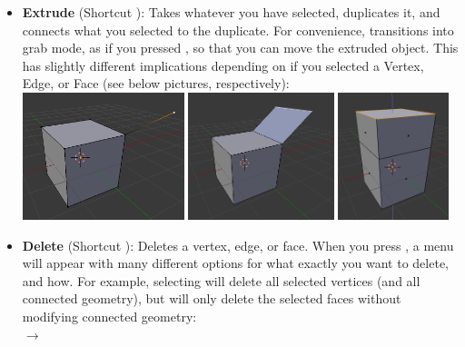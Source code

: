\documentclass[11pt]{article}
\begin{document}
\begin{itemize}
    \item \textbf{Extrude} (Shortcut ): Takes whatever you have selected, duplicates it, and
    connects what you selected to the duplicate.  For convenience, transitions into grab mode, as if
    you pressed , so that you can move the extruded object.  This has slightly different
    implications depending on if you selected a Vertex, Edge, or Face (see below pictures, respectively):\\
    \includegraphics[height=10em]{extrude-vertex} \includegraphics[height=10em]{extrude-edge}
    \includegraphics[height=10em]{extrude-face}
    \item \textbf{Delete} (Shortcut ): Deletes a vertex, edge, or face.  When you press
    , a menu will appear with many different options for what exactly you want to delete,
    and how.  For example, selecting  will delete all selected vertices (and all
    connected geometry), but  will only delete the selected faces without modifying
    connected geometry: \\
     $\rightarrow$

\end{itemize}
\end{document}
